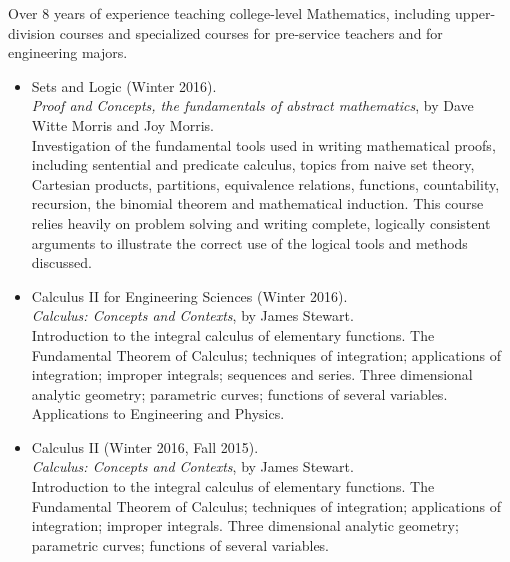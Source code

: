 \documentclass[11pt]{article}
\begin{document}

\makeletterhead

\maketitle

Over 8 years of experience teaching college-level Mathematics,
including upper-division courses
and specialized courses for pre-service teachers
and for engineering majors.



\begin{itemize}
  \item{}
    Sets and Logic (Winter 2016).\\
    \emph{Proof and Concepts, the fundamentals of abstract mathematics},
    by Dave Witte Morris and Joy Morris.\\
    Investigation of the fundamental tools used in writing mathematical
    proofs, including sentential and predicate calculus, topics from
    naive set theory, Cartesian products, partitions, equivalence
    relations, functions, countability, recursion, the binomial theorem
    and mathematical induction.  This course relies heavily on problem
    solving and writing complete, logically consistent arguments to
    illustrate the correct use of the logical tools and methods
    discussed.

  \item{}
    Calculus II for Engineering Sciences (Winter 2016).\\
    \emph{Calculus: Concepts and Contexts}, by James Stewart.\\
    Introduction to the integral calculus of elementary functions. The
    Fundamental Theorem of Calculus; techniques of integration;
    applications of integration; improper integrals; sequences and
    series. Three dimensional analytic geometry; parametric curves;
    functions of several variables. Applications to Engineering and
    Physics.

  \item{}
    Calculus II (Winter 2016, Fall 2015).\\
    \emph{Calculus: Concepts and Contexts}, by James Stewart.\\
    Introduction to the integral calculus of elementary functions. The
    Fundamental Theorem of Calculus; techniques of integration;
    applications of integration; improper integrals. Three dimensional
    analytic geometry; parametric curves; functions of several variables.
  

\end{itemize}
\end{document}
